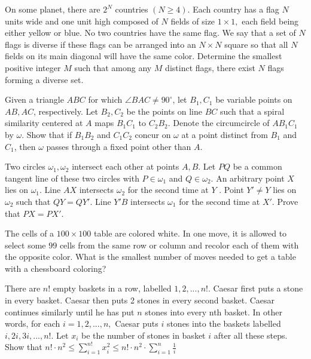 \documentclass[11pt]{scrartcl}
\begin{document}
\begin{problem}[683710365849473]
	On some planet, there are $2^N$ countries $(N \geq 4).$ Each country has a flag $N$ units wide and one unit high composed of $N$ fields of size $1 \times 1,$ each field being either yellow or blue. No two countries have the same flag. We say that a set of $N$ flags is diverse if these flags can be arranged into an $N \times N$ square so that all $N$ fields on its main diagonal will have the same color. Determine the smallest positive integer $M$ such that among any $M$ distinct flags, there exist $N$ flags forming a diverse set.
\end{problem}
\begin{problem}[852531542088551]
	Given a triangle $ABC$ for which $\angle BAC \neq 90^{\circ}$, let $B_1, C_1$ be variable points on $AB,AC$, respectively. Let $B_2,C_2$ be the points on line $BC$ such that a spiral similarity centered at $A$ maps $B_1C_1$ to $C_2B_2$. Denote the circumcircle of $AB_1C_1$ by $\omega$. Show that if $B_1B_2$ and $C_1C_2$ concur on $\omega$ at a point distinct from $B_1$ and $C_1$, then $\omega$ passes through a fixed point other than $A$.
\end{problem}
\begin{problem}[2798224660835368817]
Two circles $\omega_1,\omega_2$ intersect each other at points $A,B$. Let $PQ$ be a common tangent line of these two circles with $P \in \omega_1$ and $Q  \in  \omega_2$. An arbitrary point $X$ lies on $\omega_1$. Line $AX$ intersects $ \omega_2$ for the second time at $Y$ . Point $Y'\ne Y$ lies on $\omega_2$ such that $QY = QY'$. Line $Y'B$ intersects $ \omega_1$ for the second time at $X'$. Prove that $PX = PX'$.
\end{problem}
\begin{problem}[685138775901874]
The cells of a $100 \times 100$ table are colored white. In one move, it is allowed to select some $99$ cells from the same row or column and recolor each of them with the opposite color. What is the smallest number of moves needed to get a table with a chessboard coloring?
\end{problem}
\begin{problem}[3579058550991835669]
There are $n!$ empty baskets in a row, labelled $1, 2, . . . , n!$. Caesar
first puts a stone in every basket. Caesar then puts 2 stones in every second basket.
Caesar continues similarly until he has put $n$ stones into every nth basket. In
other words, for each $i = 1, 2, . . . , n,$ Caesar puts $i$ stones into the baskets labelled
$i, 2i, 3i, . . . , n!.$
Let $x_i$ be the number of stones in basket $i$ after all these steps. Show that
$n! \cdot n^2 \leq \sum_{i=1}^{n!} x_i^2 \leq n! \cdot n^2 \cdot \sum_{i=1}^{n} \frac{1}{i} $
\end{problem}
\end{document}
